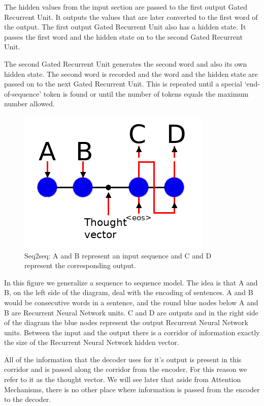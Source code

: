 The hidden values from the input section are passed to the first output Gated Recurrent Unit. It outputs the values that are later converted to the first word of the output. The first output Gated Recurrent Unit also has a hidden state. It passes the first word and the hidden state on to the second Gated Recurrent Unit.

The second Gated Recurrent Unit generates the second word and also its own hidden state. The second word is recorded and the word and the hidden state are passed on to the next Gated Recurrent Unit. This is repeated until a special `end-of-sequence' token is found or until the number of tokens equals the maximum number allowed.

\begin{figure}[H]
	\begin{center}
	
	\includegraphics[scale=0.5]{diagram-nmt}
		
\end{center}
	\caption[Sequence to Sequence Architecture]{Seq2seq: A and B represent an input sequence and C and D represent the corresponding output.}
	

\end{figure}

In this figure we generalize a sequence to sequence model. The idea is that A and B, on the left side of the diagram, deal with the encoding of sentences. A and B would be consecutive words in a sentence, and the round blue nodes below A and B are Recurrent Neural Network units. C and D are outputs and in the right side of the diagram the blue nodes represent the output Recurrent Neural Network units. Between the input and the output there is a corridor of information exactly the size of the Recurrent Neural Network hidden vector. 

All of the information that the decoder uses for it\textquoteright s output is present in this corridor and is passed along the corridor from the encoder. For this reason we refer to it as the thought vector. We will see later that aside from Attention Mechanisms, there is no other place where information is passed from the encoder to the decoder.

